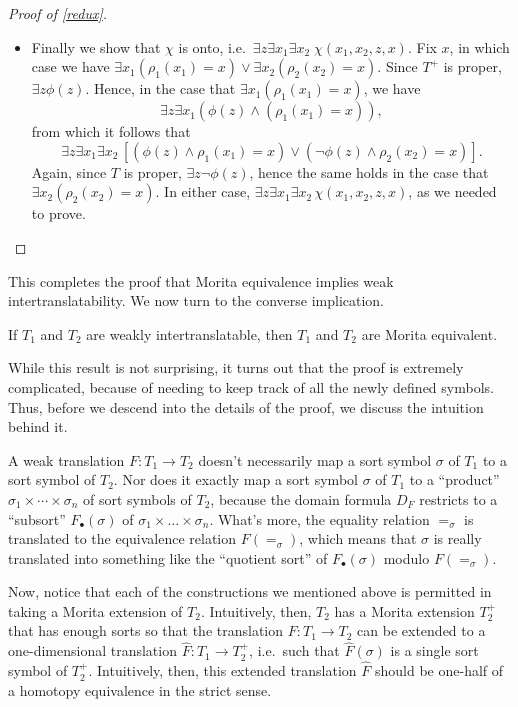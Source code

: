 \begin{proof}[Proof of \ref{redux}]
\begin{itemize}
 \item Finally we show that $\chi$ is onto, i.e.\
   $\exists z\exists x_1\exists x_2\;\chi (x_1,x_2,z,x)$.  Fix $x$, in
   which case we have
   $\exists x_1(\rho _1(x_1)=x)\vee \exists x_2(\rho _2(x_2)=x)$.
   Since $T^+$ is proper, $\exists z\phi (z)$.  Hence, in the case
   that $\exists x_1(\rho _1(x_1)=x)$, we have
   \[ \exists z\exists x_1(\phi (z)\wedge (\rho _1(x_1)=x)) ,\] from
   which it follows that
   \[ \exists z\exists x_1\exists x_2\,\left[ (\phi (z)\wedge \rho
       _1(x_1)=x)\vee (\neg \phi (z)\wedge \rho _2(x_2)=x) \right] .\]
   Again, since $T$ is proper, $\exists z\neg \phi (z)$, hence the
   same holds in the case that $\exists x_2(\rho _2(x_2)=x)$.  In
   either case, $\exists z\exists x_1\exists x_2\,\chi (x_1,x_2,z,x)$,
   as we needed to prove.
  \end{itemize}
\end{proof}


This completes the proof that Morita equivalence implies weak
intertranslatability.  We now turn to the converse implication.

\begin{thm}[Washington] If $T_1$ and $T_2$ are weakly
  intertranslatable, then $T_1$ and $T_2$ are Morita
  equivalent.  \label{it-mor} \end{thm}

While this result is not surprising, it turns out that the proof is
extremely complicated, because of needing to keep track of all the
newly defined symbols.  Thus, before we descend into the details of
the proof, we discuss the intuition behind it.

A weak translation $F:T_1\to T_2$ doesn't necessarily map a sort
symbol $\sigma$ of $T_1$ to a sort symbol of $T_2$.  Nor does it
exactly map a sort symbol $\sigma$ of $T_1$ to a ``product''
$\sigma _1\times\cdots\times \sigma _n$ of sort symbols of $T_2$,
because the domain formula $D_F$ restricts to a ``subsort''
$F_\bullet (\sigma )$ of $\sigma _1\times\dots\times\sigma _n$.
What's more, the equality relation $=_\sigma$ is translated to the
equivalence relation $F(=_\sigma )$, which means that $\sigma$ is
really translated into something like the ``quotient sort'' of
$F_\bullet (\sigma )$ modulo $F(=_\sigma )$.

Now, notice that each of the constructions we mentioned above is
permitted in taking a Morita extension of $T_2$.  Intuitively, then,
$T_2$ has a Morita extension $T_2^+$ that has enough sorts so that the
translation $F:T_1\to T_2$ can be extended to a one-dimensional
translation $\hat{F}:T_1\to T_2^+$, i.e.\ such that $\hat{F}(\sigma )$
is a single sort symbol of $T_2^+$.  Intuitively, then, this extended
translation $\hat{F}$ should be one-half of a homotopy equivalence in
the strict sense.


